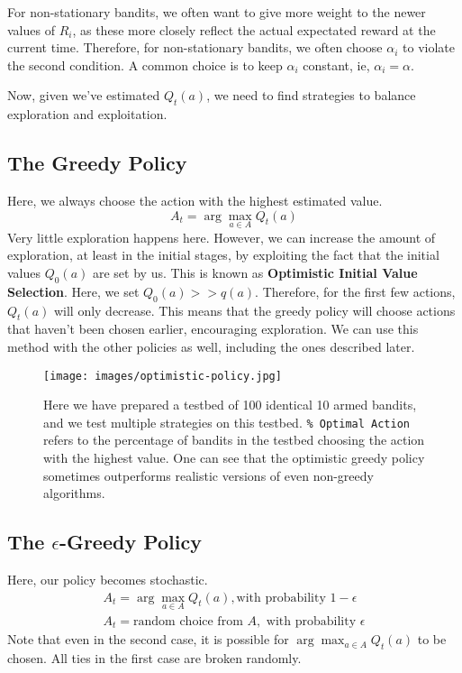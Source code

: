 \documentclass[12pt]{report}
\begin{document}
For non-stationary bandits, we often want to give more weight to the newer values of $R_{i}$, as these more closely reflect the actual expectated reward at the current time.
Therefore, for non-stationary bandits, we often choose $\alpha_{i}$ to violate the second condition. A common choice is to keep $\alpha_{i}$ constant, ie, $\alpha_{i} = \alpha$.

Now, given we've estimated $Q_{t}(a)$, we need to find strategies to balance exploration and exploitation.

\subsection{The Greedy Policy}
Here, we always choose the action with the highest estimated value.
\begin{equation}
    A_{t} = \arg\max_{a \in A} Q_{t}(a) 
\end{equation}
Very little exploration happens here. However, we can increase the amount of exploration, at least in the initial stages, by exploiting the fact that the initial values $Q_{0}(a)$ are set by us.
This is known as \textbf{Optimistic Initial Value Selection}. Here, we set $Q_{0}(a) >> q(a)$. Therefore, for the first few actions, $Q_{t}(a)$ will only decrease. This means that the greedy policy will 
choose actions that haven't been chosen earlier, encouraging exploration. We can use this method with the other policies as well, including the ones described later. 
\begin{figure}[H]
    \centering
    \texttt{[image: images/optimistic-policy.jpg]}
    \caption{Here we have prepared a testbed of 100 identical 10 armed bandits, and we test multiple strategies on this testbed. \texttt{\% Optimal Action} refers to the percentage of bandits in the testbed choosing the action with the highest value. One can see that the optimistic greedy policy sometimes outperforms realistic versions of even non-greedy algorithms.}
\end{figure}

\subsection{\texorpdfstring{The $\epsilon$-Greedy Policy}{}}
Here, our policy becomes stochastic.
\begin{eqnarray}
    A_{t} = \arg\max_{a \in A} Q_{t}(a), \text{with probability $1 - \epsilon$}\\
    A_{t} = \text{random choice from $A$}, \text{ with probability $\epsilon$}
\end{eqnarray}
Note that even in the second case, it is possible for $\arg\max_{a \in A} Q_{t}(a)$ to be chosen. All ties in the first case are broken randomly.
\end{document}
